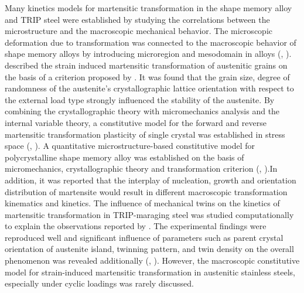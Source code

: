 \documentclass[preprint,5p,twocolumn,10pt,sort&compress]{elsarticle}
\begin{document}
Many kinetics models for martensitic transformation in the shape memory alloy and TRIP steel were established by studying the correlations between the microstructure and the macroscopic mechanical behavior. The microscopic deformation due to transformation was connected to the macroscopic behavior of shape memory alloys by introducing microregion and mesodomain in alloys (\citeauthor{FISCHER1992A}, \citeyear{FISCHER1992A}). \cite{REISNER19982457} described the strain induced martensitic transformation of austenitic grains on the basis of a criterion proposed by \cite{Fischer1997}. It was found that the grain size, degree of randomness of the austenite's crystallographic lattice orientation with respect to the external load type strongly influenced the stability of the austenite. By combining the crystallographic theory with micromechanics analysis and the internal variable theory, a constitutive model for the forward and reverse martensitic transformation plasticity of single crystal was established in stress space (\citeauthor{YanWY1998A}, \citeyear{YanWY1998A}). A quantitative microstructure-based constitutive model for polycrystalline shape memory alloy was established on the basis of micromechanics, crystallographic theory and transformation criterion (\citeauthor{Song2000Effect}, \citeyear{Song2000Effect}).In addition, it was reported that the interplay of nucleation, growth and orientation distribution of martensite would result in different macroscopic transformation kinematics and kinetics. The influence of mechanical twins on the kinetics of martensitic transformation in TRIP-maraging steel was studied computationally to explain the observations reported by \cite{WANG2014268}. The experimental findings were reproduced well and significant influence of parameters such as parent crystal orientation of austenite island, twinning pattern, and twin density on the overall phenomenon was revealed additionally (\citeauthor{GUPTA2018213}, \citeyear{GUPTA2018213}). However, the macroscopic constitutive model for strain-induced martensitic transformation in austenitic stainless steels, especially under cyclic loadings was rarely discussed.
\end{document}
